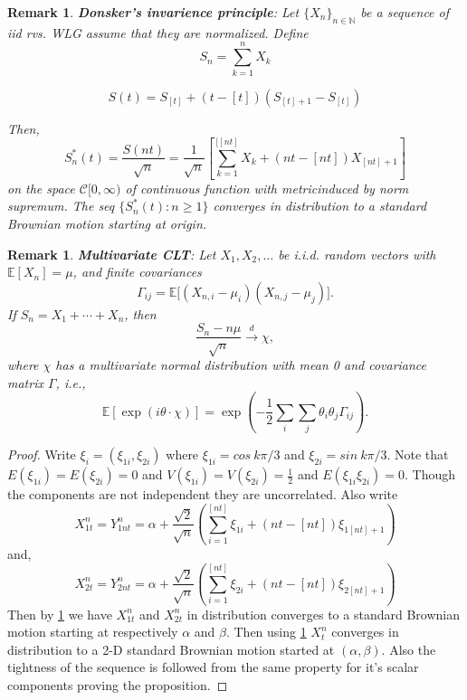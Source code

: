 \documentclass[11pt, a4paper, oneside]{report}
\numberwithin{equation}{section}
\newtheorem{remark}[theorem]{Remark}
\begin{document}
\begin{remark}\label{Donsker}\cite{PeresMortersBook}
\textbf{Donsker's invarience principle}: Let \(\{X_n\}_{n \in \mathbb{N}}\) be a sequence of iid rvs. WLG assume that they are normalized. Define 
\[
S_n = \sum_{k=1}^{n} X_k
\]

\[
S(t) = S_{[ t ]} + (t - [t]) \left( S_{[t ] + 1} - S_{[t]} \right)
\]

Then,
\[
S_n^*(t) = \frac{S(nt)}{\sqrt{n}} = \frac{1}{\sqrt{n}} \left[ \sum_{k=1}^{[[nt]} X_k + (nt - [ nt ]) X_{[ nt ] + 1} \right]
\] 
on the space \(\mathcal{C}[0,\infty)\) of continuous function with metricinduced by norm supremum. The seq $\{S^{*}_n(t): n \geq 1\}$ converges in distribution to a standard Brownian motion starting at origin.
\end{remark}
\begin{remark}\label{multivariate-clt}\cite[Theorem 3.10.7]{MR3930614}
\textbf{Multivariate CLT}: Let \( X_1, X_2, \ldots \) be i.i.d. random vectors with \( \mathbb{E}[X_n] = \mu \), and finite covariances  
\[
\Gamma_{ij} = \mathbb{E}\big[(X_{n,i} - \mu_i)(X_{n,j} - \mu_j)\big].
\]
If \( S_n = X_1 + \cdots + X_n \), then
\[
\frac{S_n - n\mu}{\sqrt{n}} \xrightarrow{d} \chi,
\]
where \( \chi \) has a multivariate normal distribution with mean 0 and covariance matrix \( \Gamma \), i.e.,
\[
\mathbb{E} \left[ \exp(i\theta \cdot \chi) \right] = \exp\left( -\frac{1}{2} \sum_i \sum_j \theta_i \theta_j \Gamma_{ij} \right).
\]
\end{remark}
\begin{proof}
Write \(\xi_i=(\xi_{1i},\xi_{2i})\) where \(\xi_{1i}=cos\ k\pi/3\) and \(\xi_{2i}=sin\ k\pi/3\). Note that \(E(\xi_{1i})=E(\xi_{2i})=0\) and \(V(\xi_{1i})=V(\xi_{2i})=\frac{1}{2}\) and \(E(\xi_{1i} \xi_{2i})=0\). Though the components are not independent they are uncorrelated. Also write 
\[
X^n_{1t}=Y^n_{1nt} = \alpha + \frac{\sqrt{2}}{\sqrt{n}} \left( \sum_{i=1}^{[nt]} \xi_{1i} + (nt - [ nt])\xi_{1[nt] + 1} \right)
\] 
and,
\[
X^n_{2t}=Y^n_{2nt} = \alpha + \frac{\sqrt{2}}{\sqrt{n}} \left( \sum_{i=1}^{[nt]} \xi_{2i} + (nt - [ nt])\xi_{2[nt] + 1} \right)
\]
Then by \ref{Donsker} we have \(X^n_{1t}\) and \(X^n_{2t}\) in distribution converges to a standard Brownian motion starting at respectively \(\alpha\) and \(\beta\). Then using \ref{multivariate-clt} \(X^n_t\) converges in distribution to a 2-D standard Brownian motion started at \((\alpha,\beta)\). Also the tightness of the sequence is followed from the same property for it's scalar components proving the proposition.
\end{proof}
\end{document}
